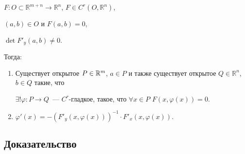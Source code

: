 \documentclass{article}
\begin{document}
        $F : O \subset \mathbb{R}^{m + n} \rightarrow \mathbb{R}^n$, $F \in C^r \left( O, \mathbb{R}^n \right)$,
        
        $(a, b) \in O$ и $F(a, b) = 0$,
        
        $\det F'_y (a, b) \neq 0$.
        
        Тогда:
        
        \begin{enumerate}
        
            \item Существует открытое $P \in \mathbb{R}^m$, $a \in P$ и также существует открытое $Q \in \mathbb{R}^n$, $b \in Q$ такие, что
            
                $\exists ! \varphi : P \rightarrow Q$~--- $C^r$-гладкое, такое, что $\forall x \in P$ $F(x, \varphi(x)) = 0$.
                
            \item $\varphi'(x) = - \left(F'_y (x, \varphi(x)) \right)^{-1} \cdot F'_x (x, \varphi(x))$.
    
        \end{enumerate}
        
        \subsection{Доказательство}
        
\end{document}
